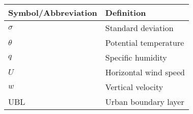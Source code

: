 \label{tab:symbols}
\begin{center}
	\begin{tabularx}{0.75\textwidth}{l X}
 		\hline
 		Symbol/Abbreviation & Definition \\
 		\hline
 		$\sigma$ & Standard deviation \\
 		$\theta$ & Potential temperature \\
 		$q$ & Specific humidity \\
 		$U$ & Horizontal wind speed \\
 		$w$ & Vertical velocity \\
 		UBL & Urban boundary layer \\
 		\hline
	\end{tabularx}
\end{center}